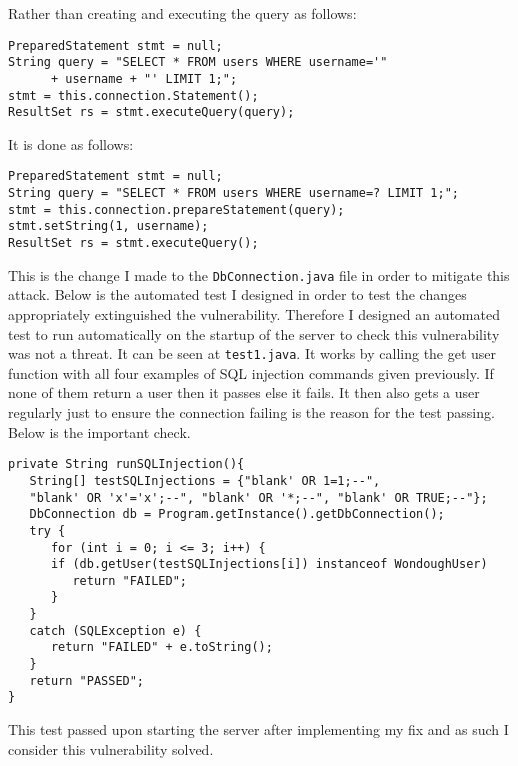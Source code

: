 Rather than creating and executing the query as follows:
\begin{verbatim}
PreparedStatement stmt = null;
String query = "SELECT * FROM users WHERE username='"
      + username + "' LIMIT 1;";
stmt = this.connection.Statement();
ResultSet rs = stmt.executeQuery(query);
\end{verbatim}
It is done as follows:
\begin{verbatim}
PreparedStatement stmt = null;
String query = "SELECT * FROM users WHERE username=? LIMIT 1;";
stmt = this.connection.prepareStatement(query);
stmt.setString(1, username);
ResultSet rs = stmt.executeQuery();
\end{verbatim}
This is the change I made to the \verb|DbConnection.java| file in order to mitigate this attack. Below is the automated test I designed in order to test the changes appropriately extinguished the
vulnerability. Therefore I designed an automated test to run automatically on the startup of the server to check this vulnerability was not a threat. It can be seen at \verb|test1.java|. It
works by calling the get user function with all four examples of SQL injection commands given previously. If none of them return a user then it passes else it fails. It then also
gets a user regularly just to ensure the connection failing is the reason for the test passing. Below is the
important check.\begin{verbatim}
private String runSQLInjection(){
   String[] testSQLInjections = {"blank' OR 1=1;--",
   "blank' OR 'x'='x';--", "blank' OR '*;--", "blank' OR TRUE;--"};
   DbConnection db = Program.getInstance().getDbConnection();
   try {
      for (int i = 0; i <= 3; i++) {
      if (db.getUser(testSQLInjections[i]) instanceof WondoughUser)
         return "FAILED";
      }
   }
   catch (SQLException e) {
      return "FAILED" + e.toString();
   }
   return "PASSED";
}
\end{verbatim}
This test passed upon starting the server after implementing my fix and as such I consider this vulnerability solved.